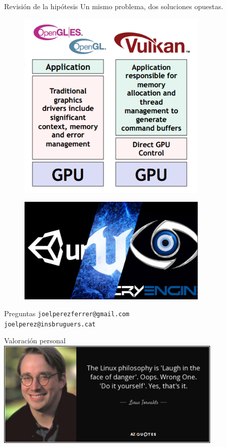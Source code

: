 \documentclass{beamer}
\begin{document}
\begin{frame}{Revisión de la hipótesis}
  Un mismo problema, dos soluciones opuestas.
  \vfill
  \begin{minipage}{0.45\textwidth}
    \centering
    \begin{figure}[h]
      \includegraphics[width=0.8\textwidth]{img/vulkan_info}
    \end{figure}
  \end{minipage}
  \begin{minipage}{0.45\textwidth}
    \centering
    \begin{figure}[h]
      \includegraphics[width=0.8\textwidth]{img/engines}
    \end{figure}
    \end{minipage}
\end{frame}
\begin{frame}{Preguntas}
  \texttt{joelperezferrer@gmail.com}\\
  \texttt{joelperez@insbruguers.cat}
  \vfill
\end{frame}
\begin{frame}{Valoración personal}
  \centering
  \includegraphics[width=0.8\textwidth]{img/linus}
\end{frame}
\end{document}
